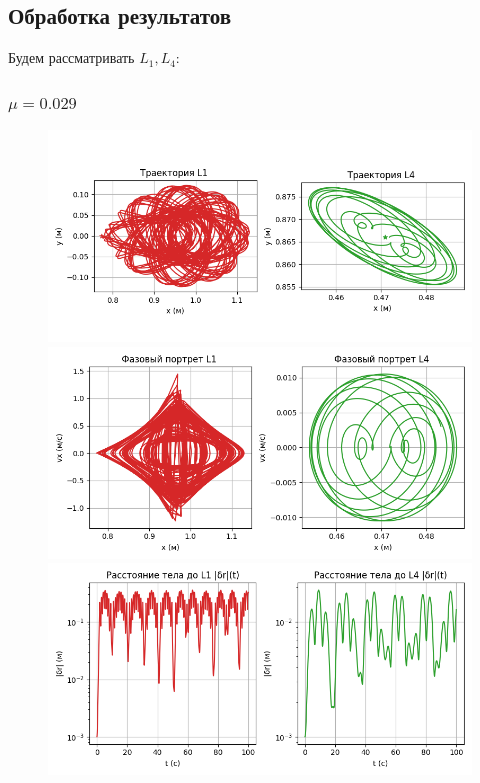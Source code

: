 \documentclass[12pt]{article}
\begin{document}
\subsection{Обработка результатов}

Будем рассматривать $L_1,L_4$:

\subsubsection{$\mu=0.029$}

\begin{figure}[H]
  \centering
  \includegraphics[width=1\textwidth]{Figure_1.png}
  \includegraphics[width=1\textwidth]{Figure_2.png}
  \includegraphics[width=1\textwidth]{Figure_3.png}
\end{figure}
\end{document}
